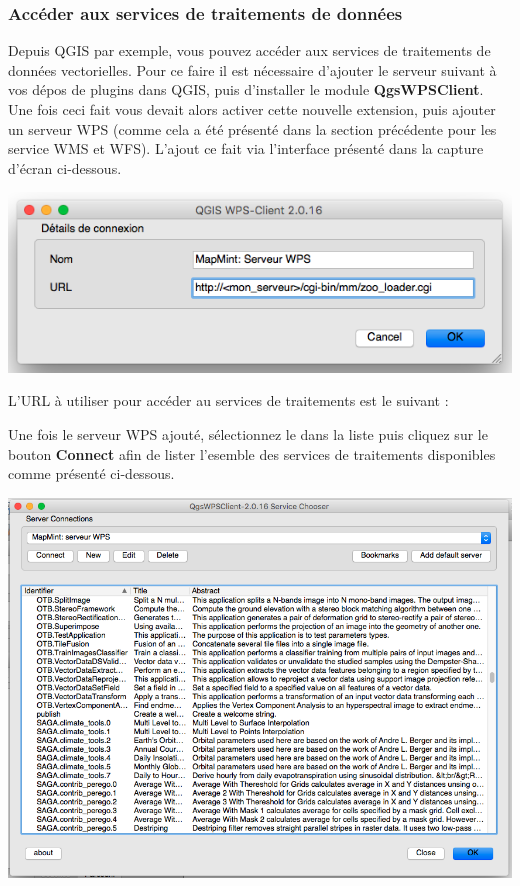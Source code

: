 \documentclass[letterpaper,10pt,french]{sphinxmanual}
\begin{document}
\subsubsection{Accéder aux services de traitements de données}
\label{introduction/usemapmint:acceder-aux-services-de-traitements-de-donnees}
Depuis QGIS par exemple, vous pouvez accéder aux services de
traitements de données vectorielles. Pour ce faire il est nécessaire
d'ajouter le serveur suivant  à vos
dépos de plugins dans QGIS, puis d'installer le module
\textbf{QgsWPSClient}. Une fois ceci fait vous devait alors activer cette
nouvelle extension, puis ajouter un serveur WPS (comme cela a été
présenté dans la section précédente pour les service WMS et
WFS). L'ajout ce fait via l'interface présenté dans la capture d'écran
ci-dessous.

\includegraphics{qgis-wps.png}

L'URL à utiliser pour accéder au services de traitements est le suivant :
\begin{quote}

\end{quote}

Une fois le serveur WPS ajouté, sélectionnez le dans la liste puis
cliquez sur le bouton \textbf{Connect} afin de lister l'esemble des
services de traitements disponibles comme présenté ci-dessous.

\includegraphics{qgis-wps-gc.png}
\end{document}
